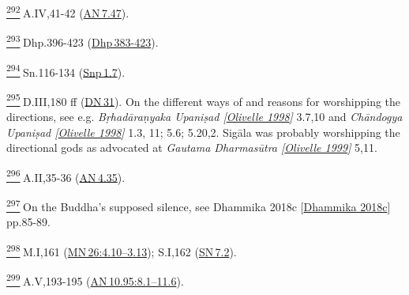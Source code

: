 \label{footprints_split_024.html_fn292}
\hyperref[footprints_split_010.htmlux5cux23fnref292]{\textsuperscript{292}} A.IV,41-42
(\href{https://suttacentral.net/an7.47/en/sujato}{AN\,7.47}).

\label{footprints_split_024.html_fn293}
\hyperref[footprints_split_010.htmlux5cux23fnref293]{\textsuperscript{293}} Dhp.396-423
(\href{https://suttacentral.net/dhp383-423/en/sujato}{Dhp\,383-423}).

\label{footprints_split_024.html_fn294}
\hyperref[footprints_split_010.htmlux5cux23fnref294]{\textsuperscript{294}} Sn.116-134
(\href{https://suttacentral.net/snp1.7/en/sujato}{Snp\,1.7}).

\label{footprints_split_024.html_fn295}
\hyperref[footprints_split_010.htmlux5cux23fnref295]{\textsuperscript{295}} D.III,180
ff (\href{https://suttacentral.net/dn31/en/sujato}{DN\,31}). On the
different ways of and reasons for worshipping the directions, see e.g.
\emph{{Bṛhadāraṇyaka Upaniṣad
{{[}\hyperref[footprints_split_022.htmlux5cux23Olivelleux5cux25201998]{Olivelle
1998}{]}}}} 3.7,10 and \emph{{Chāndogya Upaniṣad
{{[}\hyperref[footprints_split_022.htmlux5cux23Olivelleux5cux25201998]{Olivelle
1998}{]}}}} 1.3, 11; 5.6; 5.20,2. Sigāla was probably worshipping the
directional gods as advocated at \emph{{Gautama Dharmasūtra
{{[}\hyperref[footprints_split_022.htmlux5cux23Olivelleux5cux25201999]{Olivelle
1999}{]}}}} 5,11.

\label{footprints_split_024.html_fn296}
\hyperref[footprints_split_010.htmlux5cux23fnref296]{\textsuperscript{296}} A.II,35-36
(\href{https://suttacentral.net/an4.35/en/sujato}{AN\,4.35}).

\label{footprints_split_024.html_fn297}
\hyperref[footprints_split_010.htmlux5cux23fnref297]{\textsuperscript{297}} On
the Buddha's supposed silence, see {Dhammika 2018c
{{[}\hyperref[footprints_split_022.htmlux5cux23Dhammikaux5cux25202018c]{Dhammika
2018c}{]}}} pp.85-89.

\label{footprints_split_024.html_fn298}
\hyperref[footprints_split_010.htmlux5cux23fnref298]{\textsuperscript{298}} M.I,161
(\href{https://suttacentral.net/mn26/en/sujato\#4.10}{MN\,26:4.10--3.13});
S.I,162 (\href{https://suttacentral.net/sn7.2/en/sujato}{SN\,7.2}).

\label{footprints_split_024.html_fn299}
\hyperref[footprints_split_010.htmlux5cux23fnref299]{\textsuperscript{299}} A.V,193-195
(\href{https://suttacentral.net/an10.95/en/sujato\#8.1}{AN\,10.95:8.1--11.6}).

